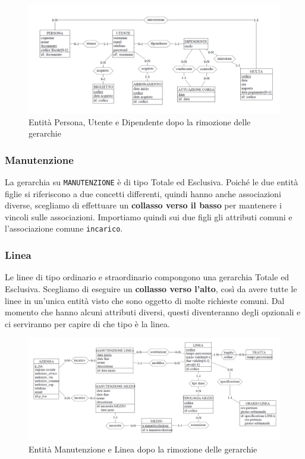 \documentclass[12pt,a4paper]{report}
\begin{document}
\begin{figure}[H]
	\centering
	\includegraphics[width=1\textwidth]{GerarchiaPersona}
 	\caption{Entità Persona, Utente e Dipendente dopo la rimozione delle gerarchie}
\end{figure}

\subsubsection{Manutenzione}
La gerarchia su \texttt{MANUTENZIONE} è di tipo Totale ed Esclusiva.
Poiché le due entità figlie si riferiscono a due concetti differenti, quindi hanno anche associazioni diverse, scegliamo di effettuare un \textbf{collasso verso il basso} per mantenere i vincoli sulle associazioni.
Importiamo quindi sui due figli gli attributi comuni e l'associazione comune \texttt{incarico}.

\subsubsection{Linea}
Le linee di tipo ordinario e straordinario compongono una gerarchia Totale ed Esclusiva.
Scegliamo di eseguire un \textbf{collasso verso l'alto}, così da avere tutte le linee in un'unica entità visto che sono oggetto di molte richieste comuni.
Dal momento che hanno alcuni attributi diversi, questi diventeranno degli opzionali e ci serviranno per capire di che tipo è la linea.

\begin{figure}[H]
	\centering
	\includegraphics[width=1\textwidth]{GerarchiaLineaManutenzione}
 	\caption{Entità Manutenzione e Linea dopo la rimozione delle gerarchie}
\end{figure}
\end{document}
